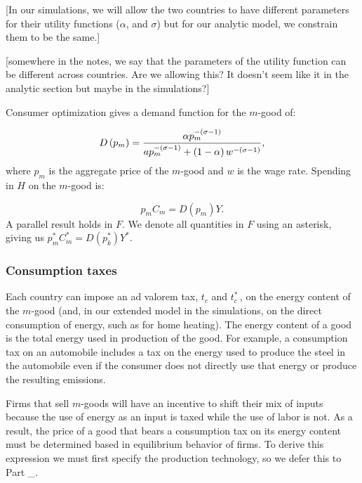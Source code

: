 \documentclass[notitlepage,12pt]{article}
\begin{document}
[In our simulations, we will allow the two countries to have different
parameters for their utility functions ($\alpha $, and $\sigma $) but for
our analytic model, we constrain them to be the same.]

[somewhere in the notes, we say that the parameters of the utility function
can be different across countries. Are we allowing this? It doesn't seem
like it in the analytic section but maybe in the simulations?] 

Consumer optimization gives a demand function for the $m$-good of:

\begin{equation*}
D\left( p_{m}\right) =\frac{\alpha p_{m}^{-\left( \sigma -1\right) }}{%
ap_{m}^{-\left( \sigma -1\right) }+\left( 1-\alpha \right) w^{-\left( \sigma
-1\right) }},
\end{equation*}%
where $p_{m}$ is the aggregate price of the $m$-good and $w$ is the wage
rate. Spending in $H$ on the $m$-good is:

\begin{equation*}
p_{m}C_{m}=D\left( p_{m}\right) Y.
\end{equation*}%
A parallel result holds in $F$. We denote all quantities in $F$ using an
asterisk, giving us $p_{m}^{\ast }C_{m}^{\ast }=D\left( p_{k}^{\ast }\right)
Y^{\ast }$.

\subsubsection{Consumption taxes}

Each country can impose an ad valorem tax, $t_{c}$ and $t_{c}^{\ast }\,$, on
the energy content of the $m$-good (and, in our extended model in the
simulations, on the direct consumption of energy, such as for home heating).
The energy content of a good is the total energy used in production of the
good. For example, a consumption tax on an automobile includes a tax on the
energy used to produce the steel in the automobile even if the consumer does
not directly use that energy or produce the resulting emissions.

Firms that sell $m$-goods will have an incentive to shift their mix of
inputs because the use of energy as an input is taxed while the use of labor
is not. As a result, the price of a good that bears a consumption tax on its
energy content must be determined based in equilibrium behavior of firms. To
derive this expression we must first specify the production technology, so
we defer this to Part \_.
\end{document}
